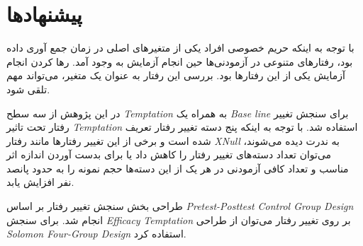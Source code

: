\section{پیشنهادها}
با  توجه به اینکه  حریم خصوصی افراد یکی از متغیر‌های اصلی در زمان جمع آوری
داده بود، رفتار‌های متنوعی در آزمودنی‌ها حین انجام آزمایش به وجود
آمد. رها کردن انجام آزمایش یکی از این رفتار‌ها
بود. بررسی این رفتار به عنوان یک متغیر، می‌تواند مهم تلقی شود.

در این پژوهش از سه سطح 
\textit{
    \gls{Temptation}
}
به همراه یک 
\textit{
    \gls{Base line}
}
برای سنجش تغییر رفتار تحت تاثیر 
\textit{
    \gls{Temptation}
} 
استفاده شد. با توجه به اینکه پنج دسته تغییر رفتار تعریف شده است و برخی از این تغییر رفتار‌ها مانند رفتار
\textit{
    \gls{XNull}
}
به ندرت دیده می‌شوند، می‌توان تعداد دسته‌های تغییر رفتار را کاهش داد یا برای بدست آوردن اندازه اثر مناسب و تعداد کافی آزمودنی 
در هر یک از این دسته‌ها حجم نمونه را به حدود پانصد نفر افزایش یابد.

طراحی بخش سنجش تغییر رفتار بر اساس 
\textit{
    \gls{Pretest-Posttest Control Group Design}
}
انجام شد. برای سنجش 
\textit{
    \gls{Efficacy}
}
\textit{
    \gls{Temptation}
} 
بر روی تغییر رفتار می‌توان از طراحی 
\textit{
    \gls{Solomon Four-Group Design}
} 
استفاده کرد.
